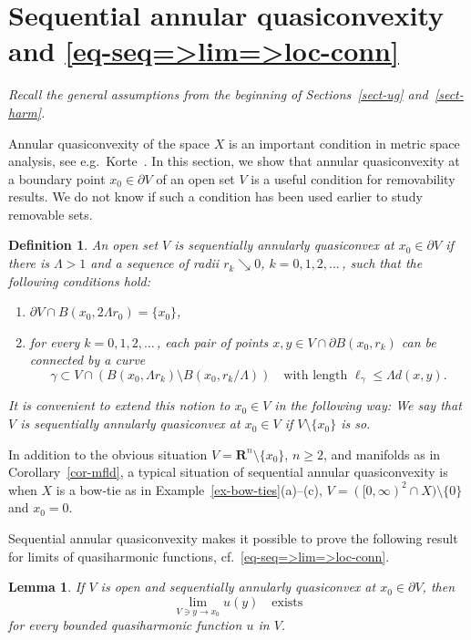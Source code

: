 \documentclass[a4paper,twoside]{article}
\theoremstyle{propositional}
\newtheorem{lem}[thm]{Lemma}
\theoremstyle{descriptive}
\newtheorem{deff}[thm]{Definition}
\theoremstyle{remarkstyle}
\newcommand{\setm}{\setminus}
\newcommand{\bdry}{\partial}
\newcommand{\bdy}{\bdry}
\newcommand{\ga}{\gamma}
\newcommand{\La}{\Lambda}
\newcommand{\R}{\mathbf{R}}
\numberwithin{equation}{section}
\begin{document}
\section{Sequential annular quasiconvexity and 
\texorpdfstring{\eqref{eq-seq=>lim=>loc-conn}}{(1.2)}} %
\label{sect-annular}

\emph{Recall the general assumptions from the beginning of Sections~\ref{sect-ug}
and~\ref{sect-harm}.}

\medskip


Annular quasiconvexity of the space $X$ is an important
condition in metric space analysis,
see e.g.\ Korte~\cite[Theorem~3.3]{Korte07}.
In this section, we show that 
annular quasiconvexity at a boundary point $x_0 \in \bdy V$ of an open set $V$ is
a useful condition for removability results.
We do not know if such a condition has been used earlier
to study removable sets.

\begin{deff}\label{def:ann-qcvx}
An open set $V$ is \emph{sequentially  annularly quasiconvex at $x_0\in \bdy V$}
if there is $\La >1$ 
and a sequence of radii $r_k \searrow 0$, $k=0,1,2,\dots$\,,
such that the following conditions hold:
\begin{enumerate}
\renewcommand{\theenumi}{\textup{(\roman{enumi})}}%
\item
$\bdy V\cap B(x_0,2\La r_0) = \{x_0\}$,
\item
for every $k=0,1,2,\dots$\,,    
each pair of points $x,y  \in V\cap \bdy B(x_0,r_k)$
can be connected by a curve 
\[
\ga \subset V\cap (B(x_0,\La r_k)\setm B(x_0,r_k/\La))
\quad \text{with length } \ell_\ga \le \La d(x,y).
\]
\end{enumerate}
It is convenient to extend this notion to $x_0\in V$ 
in the following way:
We say that $V$  is 
\emph{sequentially annularly quasiconvex at $x_0\in V$} 
if $V \setm \{x_0\}$ is so.
\end{deff} 

In addition to the obvious situation $V=\R^n\setm \{x_0\}$, $n \ge 2$,
and manifolds as in Corollary~\ref{cor-mfld},
a typical situation of sequential  annular quasiconvexity is when
$X$ is a bow-tie as in Example~\ref{ex-bow-ties}(a)--(c),
$V=([0,\infty)^2 \cap X) \setm\{0\}$ and $x_0=0$.


Sequential annular quasiconvexity makes it possible to prove the following
result for limits of quasiharmonic
functions, cf.\ \eqref{eq-seq=>lim=>loc-conn}.

\begin{lem} \label{lem-lim-ann-quasiconvex}
If $V$ is open and sequentially 
annularly quasiconvex at $x_0\in \bdy V$, then 
\[
   \lim_{V \ni y \to x_0} u(y) \quad \text{exists}
\]
for every  bounded quasiharmonic function $u$ in $V$.
\end{lem}
\end{document}
